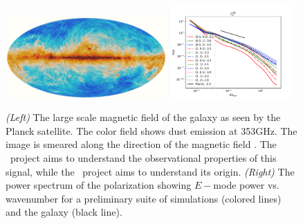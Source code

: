 
\begin{figure} \begin{center}
\includegraphics[width=0.55\textwidth]{figs/2015_353GHz_B-field.png}
\includegraphics[width=0.42\textwidth]{figs/alpha_TEB.pdf}
\caption[ ]{\emph{(Left)} The large scale magnetic field of the galaxy as seen by the Planck
satellite. The color field shows dust emission at 353GHz.  The image is smeared
along the direction of the magnetic field \citep{PlanckXIX15}.  The \nameCMB\
project aims to understand the observational properties of this signal, while the \nameGalaxies\
project aims to understand its origin. \emph{(Right)} The power spectrum of the
polarization showing $E-$mode power vs. wavenumber for a preliminary suite of
simulations (colored lines) and the galaxy (black line).}
\label{fig.planck} \end{center} \end{figure}
